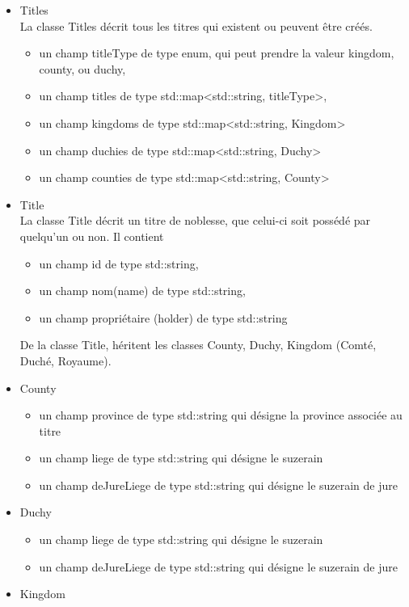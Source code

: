 \documentclass[a4paper,12pt]{article}
\begin{document}
\begin{itemize}
\item Titles\\
La classe Titles décrit tous les titres qui existent ou peuvent être créés.
\begin{itemize}
\item un champ titleType de type enum, qui peut prendre la valeur kingdom, county, ou duchy,
\item un champ titles de type std::map<std::string, titleType>,
\item un champ kingdoms de type std::map<std::string, Kingdom>
\item un champ duchies de type std::map<std::string, Duchy>
\item un champ counties de type std::map<std::string, County>
\end{itemize}
\item Title\\
La classe Title décrit un titre de noblesse, que celui-ci soit possédé par quelqu'un ou non. Il contient
\begin{itemize}
\item un champ id de type std::string,
\item un champ nom(name) de type std::string,
\item un champ propriétaire (holder) de type std::string
\end{itemize}
De la classe Title, héritent les classes County, Duchy, Kingdom (Comté, Duché, Royaume). 

\item County\\
\begin{itemize}
\item un champ province de type std::string qui désigne la province associée au titre
\item un champ liege de type std::string qui désigne le suzerain
\item un champ deJureLiege de type std::string qui désigne le suzerain de jure
\end{itemize}
\item Duchy\\
\begin{itemize}
\item un champ liege de type std::string qui désigne le suzerain
\item un champ deJureLiege de type std::string qui désigne le suzerain de jure
\end{itemize}
\item Kingdom\\


\end{itemize}
\end{document}
